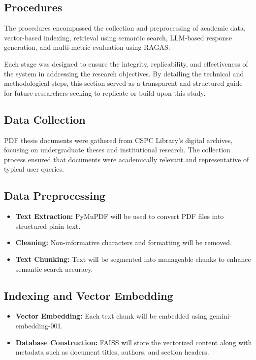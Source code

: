 \begin{refsection}
\section{Procedures}

The procedures encompassed the collection and preprocessing of academic data, vector-based indexing, retrieval using semantic search, LLM-based response generation, and multi-metric evaluation using RAGAS.

Each stage was designed to ensure the integrity, replicability, and effectiveness of the system in addressing the research objectives. By detailing the technical and methodological steps, this section served as a transparent and structured guide for future researchers seeking to replicate or build upon this study.

\subsection*{Data Collection}

PDF thesis documents were gathered from CSPC Library’s digital archives, focusing on undergraduate theses and institutional research. The collection process ensured that documents were academically relevant and representative of typical user queries.

\subsection{Data Preprocessing}

\begin{itemize}
    \item \textbf{Text Extraction:} PyMuPDF will be used to convert PDF files into structured plain text.
    \item \textbf{Cleaning:} Non-informative characters and formatting will be removed.
    \item \textbf{Text Chunking:} Text will be segmented into manageable chunks to enhance semantic search accuracy.
\end{itemize}

\subsection*{Indexing and Vector Embedding}

\begin{itemize}
    \item \textbf{Vector Embedding:} Each text chunk will be embedded using gemini-embedding-001.
    \item \textbf{Database Construction:} FAISS will store the vectorized content along with metadata such as document titles, authors, and section headers.
\end{itemize}


\end{refsection}
